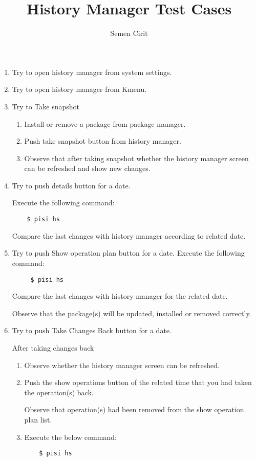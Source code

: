 \documentclass[a4paper,10pt]{article}
\title{History Manager Test Cases}
\author{Semen Cirit}
\begin{document}
\maketitle

\begin{enumerate}
\item Try to open history manager from system settings.
\item Try to open history manager from Kmenu.
\item Try to Take snapshot	
\begin{enumerate}
    \item Install or remove a package from package manager.
    \item Push take snapshot button from history manager.
    \item Observe that after taking snapshot whether the history manager screen can be refreshed and show new changes.
\end{enumerate}

\item Try to push details button for a date.

    Execute the following command:
\begin{verbatim}
    $ pisi hs
\end{verbatim} 

    Compare the last changes with history manager according to related date. 

\item Try to push Show operation plan button for a date.
    Execute the following command:
\begin{verbatim}
     $ pisi hs
\end{verbatim} 
    Compare the last changes with history manager for the related date.

    Observe that the package(s) will be updated, installed or removed correctly.

\item Try to push Take Changes Back button for a date.

        After taking changes back 
\begin{enumerate}
        \item Observe whether the history manager screen can be refreshed.
        \item Push the show operations button of the related time that you had taken the operation(s) back.

              Observe that operation(s) had been removed from the show operation plan list.
     	\item Execute the below command:
\begin{verbatim}
    $ pisi hs
\end{verbatim} 


\end{enumerate}
\end{enumerate}
\end{document}
